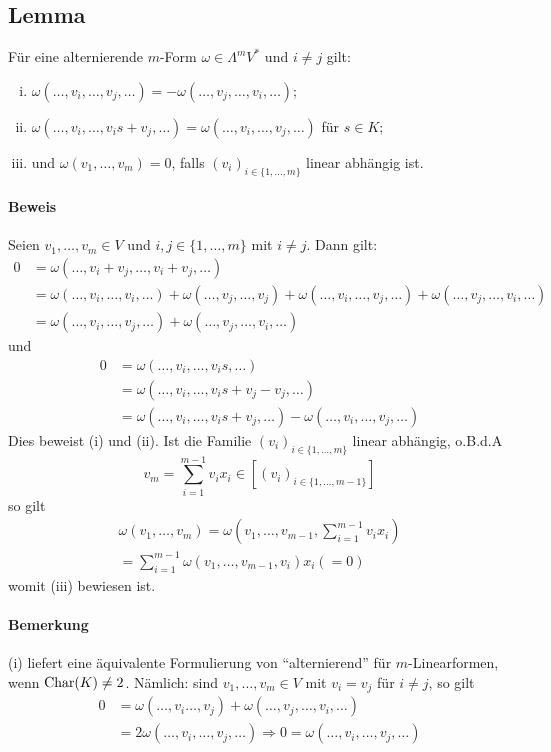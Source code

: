 \subsection{Lemma}
	\begin{Lemma}
		Für eine alternierende $ m $-Form $ \omega \in \Lambda^mV^* $ und $ i\neq j $ gilt:
		\begin{enumerate}[(i)]
			\item $ \omega(\dots,v_i,\dots,v_j,\dots) = -\omega (\dots,v_j,\dots,v_i,\dots)$;
			\item $ \omega(\dots,v_i,\dots,v_is+v_j,\dots) = \omega(\dots,v_i,\dots,v_j,\dots) $ für $ s\in K $;
			\item und $ \omega(v_1,\dots,v_m)=0 $, falls $ (v_i)_{i\in \{1,\dots,m\}} $ linear abhängig ist.
		\end{enumerate}
\paragraph{Beweis}
	Seien $ v_1,\dots,v_m\in V $ und $ i,j\in \{1,\dots,m\} $ mit $ i\neq j $. Dann gilt:
		\begin{align*}
			0 &= \omega(\dots,v_i+v_j,\dots,v_i+v_j,\dots)\\
			&= \omega(\dots,v_i,\dots,v_i,\dots)+\omega(\dots,v_j,\dots,v_j)+\omega(\dots,v_i,\dots,v_j,\dots)+\omega(\dots,v_j,\dots,v_i,\dots)\\
			&= \omega(\dots,v_i,\dots,v_j,\dots)+\omega(\dots,v_j,\dots,v_i,\dots)
		\end{align*}
	und
		\begin{align*}
		0&=\omega(\dots,v_i,\dots,v_is,\dots)\\
		&= \omega(\dots,v_i,\dots,v_is+v_j-v_j,\dots)\\
		&= \omega(\dots,v_i,\dots,v_is+v_j,\dots)-\omega(\dots,v_i,\dots,v_j,\dots)
		\end{align*}
	Dies beweist (i) und (ii). Ist die Familie $ (v_i)_{i\in \{1,\dots,m\}} $ linear abhängig, o.B.d.A
		\[ v_m = \sum_{i=1}^{m-1}v_ix_i \in [(v_i)_{i\in \{1,\dots,m-1\}}] \]
	so gilt
		\begin{gather*}
		\omega(v_1,\dots,v_m)=\omega(v_1,\dots,v_{m-1},\sum_{i=1}^{m-1}v_ix_i)\\
		= \sum_{i=1}^{m-1}\omega(v_1,\dots,v_{m-1},v_i)x_i (=0)
		\end{gather*}
	womit (iii) bewiesen ist.
	\end{Lemma}
\paragraph{Bemerkung}
	(i) liefert eine äquivalente Formulierung von "`alternierend"' für $ m $-Linearformen, wenn $ \operatorname{Char} (K)\neq 2 $.
	Nämlich: sind $ v_1,\dots,v_m\in V $ mit $ v_i=v_j $ für $ i\neq j $, so gilt
		\begin{align*}
		0 &= \omega(\dots,v_i\dots,v_j)+\omega(\dots,v_j,\dots,v_i,\dots)\\
		&= 2\omega(\dots,v_i,\dots,v_j,\dots) \Rightarrow 0 = \omega(\dots,v_i,\dots,v_j,\dots)
		\end{align*}
